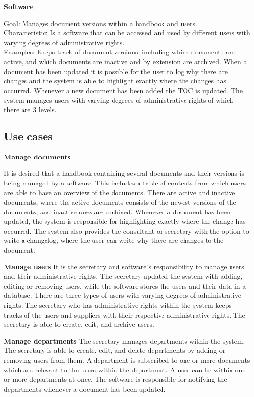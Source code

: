 \textbf{Software}

Goal: Manages document versions within a handbook and users.
\\
Characteristic: Is a software that can be accessed and used by different users with varying degrees of administrative rights.
\\
Examples: Keeps track of document versions; including which documents are active, and which documents are inactive and by extension are archived. When a document has been updated it is possible for the user to log why there are changes and the system is able to highlight exactly where the changes has occurred.
Whenever a new document has been added the TOC is updated.
The system manages users with varying degrees of administrative rights of which there are 3 levels.


\subsection{Use cases}

\textbf{Manage documents}

It is desired that a handbook containing several documents and their versions is being managed by a software. This includes a table of contents from which users are able to have an overview of the documents. There are active and inactive documents, where the active documents consists of the newest versions of the documents, and inactive ones are archived. Whenever a document has been updated, the system is responsible for highlighting exactly where the change has occurred. The system also provides the consultant or secretary with the option to write a changelog, where the user can write why there are changes to the document.

\textbf{Manage users}
It is the secretary and software's responsibility to manage users and their administrative rights.
The secretary updated the system with adding, editing or removing users, while the software stores the users and their data in a database.
There are three types of users with varying degrees of administrative rights.
The secretary who has administrative rights within the system keeps tracks of the users and suppliers with their respective administrative rights.
The secretary is able to create, edit, and archive users.

\textbf{Manage departments}
The secretary manages departments within the system.
The secretary is able to create, edit, and delete departments by adding or removing users from them.
A department is subscribed to one or more documents which are relevant to the users within the department.
A user can be within one or more departments at once.
The software is responsible for notifying the departments whenever a document has been updated.

